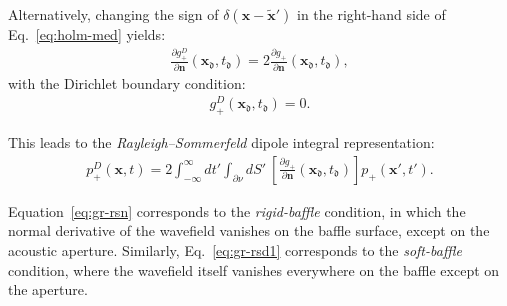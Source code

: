 \documentclass[11pt,reqno]{amsart}
\theoremstyle{remark}
\newtheorem{remark}{Remark}
\theoremstyle{italic_lemma}
\newcommand{\bx}{\boldsymbol{x}}
\newcommand{\bn}{\boldsymbol{n}}
\newcommand{\fd}{\mathfrak{d}}
\begin{document}
\noindent
Alternatively, changing the sign of \( \delta(\bx - \tilde{\bx}') \) in the right-hand side of Eq.~\eqref{eq:holm-med} yields:
\begin{align} \label{eq:dir1}
    \frac{\partial g_+^D}{\partial \bn}(\bx_{\fd}, t_{\fd}) = 2 \frac{\partial g_+}{\partial \bn}(\bx_{\fd}, t_{\fd}),
\end{align}
with the Dirichlet boundary condition:
\begin{align}\label{eq:dir-b}
    g_+^D(\bx_{\fd}, t_{\fd}) = 0.
\end{align}

\noindent
This leads to the \textit{Rayleigh–Sommerfeld} dipole integral representation:
\begin{align} \label{eq:gr-rsd1}
    p_+^D(\bx, t) = 2 \int_{-\infty}^{\infty} dt' \int_{\partial \nu} dS' \ 
    \left[ \frac{\partial g_+}{\partial \bn} (\bx_{\fd}, t_{\fd})\right] p_+(\bx', t').
\end{align}





Equation~\eqref{eq:gr-rsn} corresponds to the \textit{rigid-baffle} condition, in which the normal derivative of the wavefield vanishes on the baffle surface, except on the acoustic aperture. Similarly, Eq.~\eqref{eq:gr-rsd1} corresponds to the \textit{soft-baffle} condition, where the wavefield itself vanishes everywhere on the baffle except on the aperture.
\end{document}
